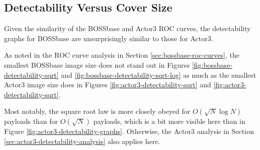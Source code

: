 \documentclass[11pt,a4paper,twoside,openright]{report}
\begin{document}
\subsection{Detectability Versus Cover Size}

Given the similarity of the BOSSbase and Actor3 ROC curves, the detectability graphs for BOSSbase are unsurprisingly similar to those for Actor3.

As noted in the ROC curve analysis in Section \ref{sec:bossbase-roc-curves}, the smallest BOSSbase image size does not stand out in Figures \ref{fig:bossbase-detectability-sqrt} and \ref{fig:bossbase-detectability-sqrt-log} as much as the smallest Actor3 image size does in Figures \ref{fig:actor3-detectability-sqrt} and \ref{fig:actor3-detectability-sqrt}.

Most notably, the square root law is more closely obeyed for $O(\sqrt{N} \log{N})$ payloads than for $O(\sqrt{N})$ payloads, which is a bit more visible here than in Figure \ref{fig:actor3-detectability-graphs}. Otherwise, the Actor3 analysis in Section \ref{sec:actor3-detectability-analysis} also applies here.
\end{document}
